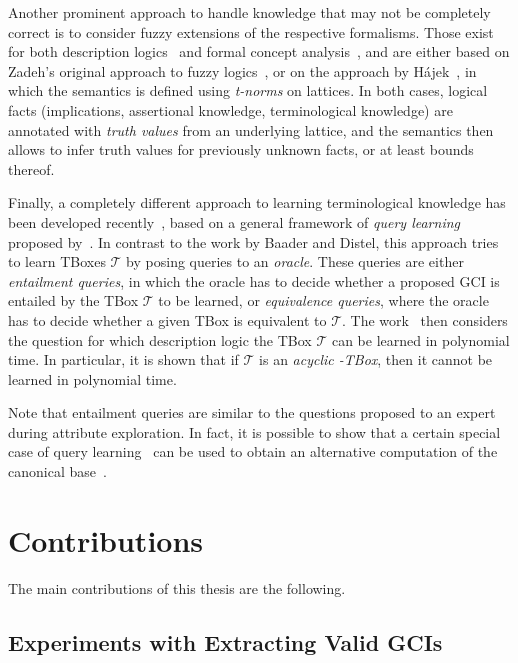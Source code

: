 Another prominent approach to handle knowledge that may not be completely correct is to
consider fuzzy extensions of the respective formalisms.  Those exist for both description
logics~\cite{journals/fss/BobilloS09,journals/ws/LukasiewiczS08} and formal concept
analysis~\cite{Pollandt97b,conf/cla/BelohlavekV05}, and are either based on Zadeh's
original approach to fuzzy logics~\cite{journals/iandc/Zadeh65}, or on the approach by
Hájek~\cite{hajek1998metamathematics}, in which the semantics is defined using
\emph{t-norms} on lattices.  In both cases, logical facts (implications, assertional
knowledge, terminological knowledge) are annotated with \emph{truth values} from an
underlying lattice, and the semantics then allows to infer truth values for previously
unknown facts, or at least bounds thereof.

Finally, a completely different approach to learning terminological knowledge has been
developed recently~\cite{conf/dlog/KonevLW13}, based on a general framework of \emph{query
  learning} proposed by~\cite{journals/ml/Angluin87}.  In contrast to the work by Baader
and Distel, this approach tries to learn TBoxes $\mathcal{T}$ by posing queries to an
\emph{oracle}.  These queries are either \emph{entailment queries}, in which the oracle
has to decide whether a proposed GCI is entailed by the TBox $\mathcal{T}$ to be learned,
or \emph{equivalence queries}, where the oracle has to decide whether a given TBox is
equivalent to $\mathcal{T}$.  The work~\cite{conf/dlog/KonevLW13} then considers
the question for which description logic the TBox $\mathcal{T}$ can be learned in
polynomial time.  In particular, it is shown that if $\mathcal{T}$ is an \emph{acyclic
  \EL-TBox}, then it cannot be learned in polynomial time.

Note that entailment queries are similar to the questions proposed to an expert during
attribute exploration.  In fact, it is possible to show that a certain special case of
query learning~\cite{journals/ml/AngluinFP92} can be used to obtain an alternative
computation of the canonical base~\cite{journals/ml/AriasB11}.

\section{Contributions}
\label{sec:contributions}

The main contributions of this thesis are the following.

\subsection{Experiments with Extracting Valid GCIs}
\label{sec:exper-with-extr}

